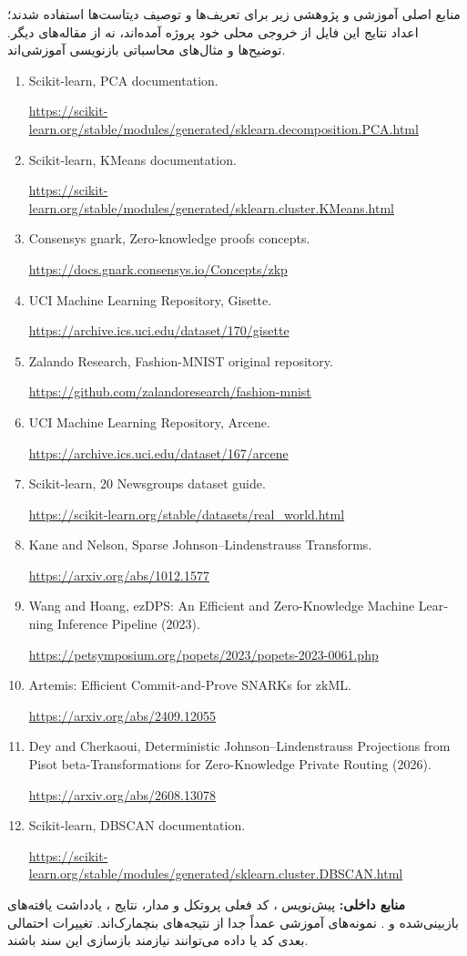 \documentclass[11pt,a4paper]{article}
\begin{document}
منابع اصلی آموزشی و پژوهشی زیر برای تعریف‌ها و توصیف دیتاست‌ها استفاده شدند؛ اعداد نتایج این فایل از خروجی محلی خود پروژه آمده‌اند، نه از مقاله‌های دیگر. توضیح‌ها و مثال‌های محاسباتی بازنویسی آموزشی‌اند.
\begin{latin}\small\linespread{1.05}\selectfont
\begin{enumerate}
\item Scikit-learn, PCA documentation.\par
\url{https://scikit-learn.org/stable/modules/generated/sklearn.decomposition.PCA.html}
\item Scikit-learn, KMeans documentation.\par
\url{https://scikit-learn.org/stable/modules/generated/sklearn.cluster.KMeans.html}
\item Consensys gnark, Zero-knowledge proofs concepts.\par
\url{https://docs.gnark.consensys.io/Concepts/zkp}
\item UCI Machine Learning Repository, Gisette.\par
\url{https://archive.ics.uci.edu/dataset/170/gisette}
\item Zalando Research, Fashion-MNIST original repository.\par
\url{https://github.com/zalandoresearch/fashion-mnist}
\item UCI Machine Learning Repository, Arcene.\par
\url{https://archive.ics.uci.edu/dataset/167/arcene}
\item Scikit-learn, 20 Newsgroups dataset guide.\par
\url{https://scikit-learn.org/stable/datasets/real_world.html}
\item Kane and Nelson, Sparse Johnson--Lindenstrauss Transforms.\par
\url{https://arxiv.org/abs/1012.1577}
\item Wang and Hoang, ezDPS: An Efficient and Zero-Knowledge Machine Learning Inference Pipeline (2023).\par
\url{https://petsymposium.org/popets/2023/popets-2023-0061.php}
\item Artemis: Efficient Commit-and-Prove SNARKs for zkML.\par
\url{https://arxiv.org/abs/2409.12055}
\item Dey and Cherkaoui, Deterministic Johnson--Lindenstrauss Projections from Pisot beta-Transformations for Zero-Knowledge Private Routing (2026).\par
\url{https://arxiv.org/abs/2608.13078}
\item Scikit-learn, DBSCAN documentation.\par
\url{https://scikit-learn.org/stable/modules/generated/sklearn.cluster.DBSCAN.html}
\end{enumerate}
\end{latin}
\textbf{منابع داخلی:} پیش‌نویس ، کد فعلی پروتکل و مدار، نتایج ، یادداشت یافته‌های بازبینی‌شده و . نمونه‌های آموزشی عمداً جدا از نتیجه‌های بنچمارک‌اند. تغییرات احتمالی بعدی کد یا داده می‌توانند نیازمند بازسازی این سند باشند.
\end{document}

